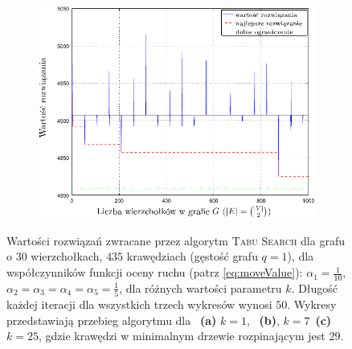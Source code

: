 \begin{figure}[!htbp]
\begin{subfigure}[b]{0.32\textwidth}
		\includegraphics[width=\textwidth]{Chapter_VI/RRIMST7-example/RRIMST7_psfrag}
		\caption{}
		\label{fig:rrimst2:c}
	\end{subfigure}
	\hfill\null
	\caption{
		Wartości rozwiązań zwracane przez algorytm \textsc{Tabu Search} dla grafu o $30$ wierzchołkach, $435$ krawędziach (gęstość grafu $q = 1$), dla współczynników funkcji oceny ruchu (patrz \ref{eq:moveValue}): $\alpha_{1} = \frac{1}{10}$, $\alpha_{2} = \alpha_{3} = \alpha_{4} = \alpha_{5} = \frac{1}{5}$, dla różnych wartości parametru $k$. Długość każdej iteracji dla wszystkich trzech wykresów wynosi $50$. Wykresy przedstawiają przebieg algorytmu dla ~\textbf{(a)} $k = 1$, ~\textbf{(b)}, $k = 7$~\textbf{(c)} $k = 25$, gdzie krawędzi w minimalnym drzewie rozpinającym jest $29$.
	}
	\label{fig:rrimst2}
\end{figure}


